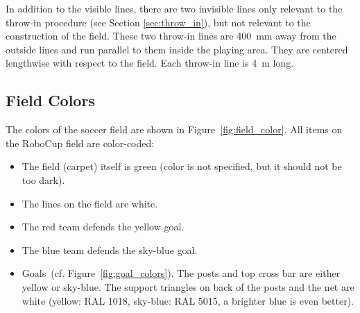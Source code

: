 \documentclass[12pt]{article}
\newcommand{\cf}{\mbox{cf.}\xspace}
\begin{document}
In addition to the visible lines, there are two invisible lines only relevant to the throw-in procedure (see Section \ref{sec:throw_in}), but not relevant to the construction of the field. These two throw-in lines are 400~mm away from the outside lines and run parallel to them inside the playing area. They are centered lengthwise with respect to the field. Each throw-in line is 4~m long.

\subsection{Field Colors}

The colors of the soccer field are shown in Figure~\ref{fig:field_color}. All items on the RoboCup field are color-coded:

\begin{itemize}

\item The field (carpet) itself is green (color is not specified, but it should not be too dark).

\item The lines on the field are white.

\item The red team defends the yellow goal.

\item The blue team defends the sky-blue goal.

\item Goals~(\cf Figure~\ref{fig:goal_colors}). The posts and top cross bar are either yellow or sky-blue. The support triangles on back of the posts and the net are white (yellow: RAL 1018, sky-blue: RAL 5015, a brighter blue is even better).

\end{itemize}
\end{document}
